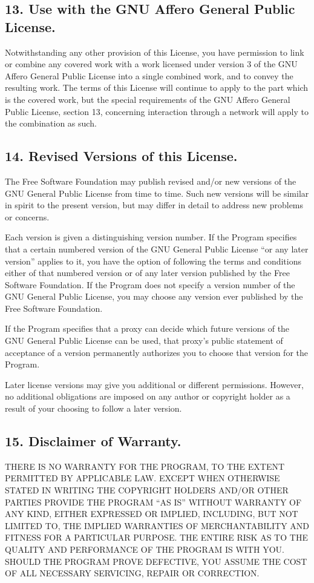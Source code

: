 \documentclass[letterpaper,10pt,english]{sphinxmanual}
\begin{document}
\subsection{13. Use with the GNU Affero General Public License.}
\label{license:use-with-the-gnu-affero-general-public-license}
Notwithstanding any other provision of this License, you have
permission to link or combine any covered work with a work licensed
under version 3 of the GNU Affero General Public License into a single
combined work, and to convey the resulting work.  The terms of this
License will continue to apply to the part which is the covered work,
but the special requirements of the GNU Affero General Public License,
section 13, concerning interaction through a network will apply to the
combination as such.


\subsection{14. Revised Versions of this License.}
\label{license:revised-versions-of-this-license}
The Free Software Foundation may publish revised and/or new versions of
the GNU General Public License from time to time.  Such new versions will
be similar in spirit to the present version, but may differ in detail to
address new problems or concerns.

Each version is given a distinguishing version number.  If the
Program specifies that a certain numbered version of the GNU General
Public License ``or any later version'' applies to it, you have the
option of following the terms and conditions either of that numbered
version or of any later version published by the Free Software
Foundation.  If the Program does not specify a version number of the
GNU General Public License, you may choose any version ever published
by the Free Software Foundation.

If the Program specifies that a proxy can decide which future
versions of the GNU General Public License can be used, that proxy's
public statement of acceptance of a version permanently authorizes you
to choose that version for the Program.

Later license versions may give you additional or different
permissions.  However, no additional obligations are imposed on any
author or copyright holder as a result of your choosing to follow a
later version.


\subsection{15. Disclaimer of Warranty.}
\label{license:disclaimer-of-warranty}
THERE IS NO WARRANTY FOR THE PROGRAM, TO THE EXTENT PERMITTED BY
APPLICABLE LAW.  EXCEPT WHEN OTHERWISE STATED IN WRITING THE COPYRIGHT
HOLDERS AND/OR OTHER PARTIES PROVIDE THE PROGRAM ``AS IS'' WITHOUT WARRANTY
OF ANY KIND, EITHER EXPRESSED OR IMPLIED, INCLUDING, BUT NOT LIMITED TO,
THE IMPLIED WARRANTIES OF MERCHANTABILITY AND FITNESS FOR A PARTICULAR
PURPOSE.  THE ENTIRE RISK AS TO THE QUALITY AND PERFORMANCE OF THE PROGRAM
IS WITH YOU.  SHOULD THE PROGRAM PROVE DEFECTIVE, YOU ASSUME THE COST OF
ALL NECESSARY SERVICING, REPAIR OR CORRECTION.
\end{document}

